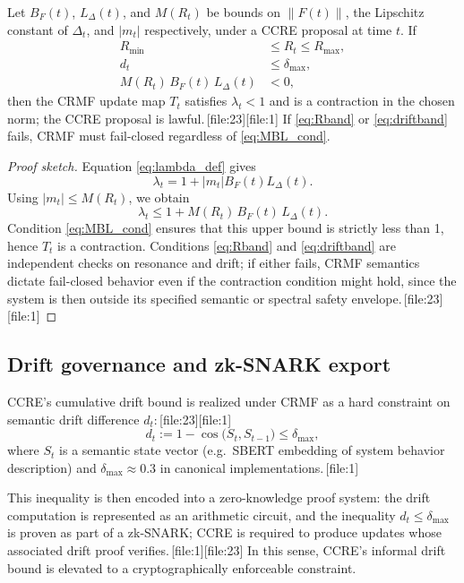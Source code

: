 \documentclass[11pt]{article}
\begin{document}
\begin{theorem}
Let $B_F(t)$, $L_\Delta(t)$, and $M(R_t)$ be bounds on $\|F(t)\|$, the Lipschitz constant of $\Delta_t$, and $|m_t|$ respectively, under a CCRE proposal at time $t$.
If
\begin{align}
  R_{\min} &\le R_t \le R_{\max}, \label{eq:Rband}\\
  d_t &\le \delta_{\max},\label{eq:driftband}\\
  M(R_t)\,B_F(t)\,L_\Delta(t) &< 0, \label{eq:MBL_cond}
\end{align}
then the CRMF update map $T_t$ satisfies $\lambda_t<1$ and is a contraction in the chosen norm; the CCRE proposal is lawful.\,[file:23][file:1]
If \eqref{eq:Rband} or \eqref{eq:driftband} fails, CRMF must fail-closed regardless of \eqref{eq:MBL_cond}.
\end{theorem}

\begin{proof}[Proof sketch]
Equation \eqref{eq:lambda_def} gives
\[
  \lambda_t = 1 + |m_t| B_F(t) L_\Delta(t).
\]
Using $|m_t|\le M(R_t)$, we obtain
\[
  \lambda_t \le 1 + M(R_t)\,B_F(t)\,L_\Delta(t).
\]
Condition \eqref{eq:MBL_cond} ensures that this upper bound is strictly less than 1, hence $T_t$ is a contraction.
Conditions \eqref{eq:Rband} and \eqref{eq:driftband} are independent checks on resonance and drift; if either fails, CRMF semantics dictate fail-closed behavior even if the contraction condition might hold, since the system is then outside its specified semantic or spectral safety envelope.\,[file:23][file:1]
\end{proof}

\subsection{Drift governance and zk-SNARK export}

CCRE's cumulative drift bound is realized under CRMF as a hard constraint on semantic drift difference $d_t$:\,[file:23][file:1]
\[
  d_t := 1 - \cos\bigl(S_t, S_{t-1}\bigr) \le \delta_{\max},
\]
where $S_t$ is a semantic state vector (e.g.\ SBERT embedding of system behavior description) and $\delta_{\max}\approx 0.3$ in canonical implementations.\,[file:1]

This inequality is then encoded into a zero-knowledge proof system: the drift computation is represented as an arithmetic circuit, and the inequality $d_t \le \delta_{\max}$ is proven as part of a zk-SNARK; CCRE is required to produce updates whose associated drift proof verifies.\,[file:1][file:23]
In this sense, CCRE's informal drift bound is elevated to a cryptographically enforceable constraint.
\end{document}
